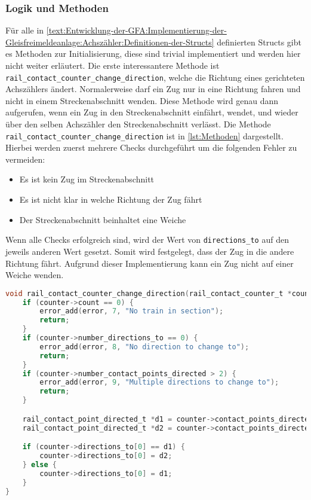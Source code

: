 \subsubsection{Logik und Methoden}\label{text:Entwicklung-der-GFA:Implementierung-der-Gleisfreimeldeanlage:Achszähler:Logik-und-Methoden-der-Achszähler}

Für alle in \autoref{text:Entwicklung-der-GFA:Implementierung-der-Gleisfreimeldeanlage:Achszähler:Definitionen-der-Structs}  definierten Structs gibt es Methoden zur Initialisierung, diese sind trivial implementiert und werden hier nicht weiter erläutert. Die erste interessantere Methode ist \texttt{rail\_contact\_counter\_change\_direction}, welche die Richtung eines gerichteten Achszählers ändert. Normalerweise darf ein Zug nur in eine Richtung fahren und nicht in einem Streckenabschnitt wenden. Diese Methode wird genau dann aufgerufen, wenn ein Zug in den Streckenabschnitt einfährt, wendet, und wieder über den selben Achszähler den Streckenabschnitt verlässt. Die Methode \texttt{rail\_contact\_counter\_change\_direction} ist in \autoref{lst:Methoden} dargestellt. Hierbei werden zuerst mehrere Checks durchgeführt um die folgenden Fehler zu vermeiden:
\begin{itemize}
    \item Es ist kein Zug im Streckenabschnitt
    \item Es ist nicht klar in welche Richtung der Zug fährt
    \item Der Streckenabschnitt beinhaltet eine Weiche
\end{itemize}
Wenn alle Checks erfolgreich sind, wird der Wert von \texttt{directions\_to} auf den jeweils anderen Wert gesetzt. Somit wird festgelegt, dass der Zug in die andere Richtung fährt. Aufgrund dieser Implementierung kann ein Zug nicht auf einer Weiche wenden. 

\begin{lstlisting}[caption={Methoden der Achszähler},label={lst:Methoden},language=C]
  void rail_contact_counter_change_direction(rail_contact_counter_t *counter, error_t *error) {
    if (counter->count == 0) {
        error_add(error, 7, "No train in section");
        return;
    }
    if (counter->number_directions_to == 0) {
        error_add(error, 8, "No direction to change to");
        return;
    }
    if (counter->number_contact_points_directed > 2) {
        error_add(error, 9, "Multiple directions to change to");
        return;
    }

    rail_contact_point_directed_t *d1 = counter->contact_points_directed[0];
    rail_contact_point_directed_t *d2 = counter->contact_points_directed[1];

    if (counter->directions_to[0] == d1) {
        counter->directions_to[0] = d2;
    } else {
        counter->directions_to[0] = d1;
    }
}
\end{lstlisting}


